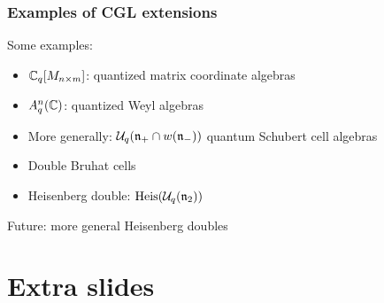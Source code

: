 \documentclass[aspectratio=169]{beamer}
\begin{document}
\begin{frame}
	\frametitle{Examples of CGL extensions}

	Some examples:
	\begin{itemize}
		\item $\mathbb{C}_q[M_{n\times m}]$: quantized matrix coordinate algebras
		\item $A^n_q(\mathbb{C})$: quantized Weyl algebras
		\item More generally: $\mathcal{U}_q(\mathfrak{n}_+ \cap w(\mathfrak{n}_-))$ quantum Schubert cell algebras
		\item Double Bruhat cells \pause
		\item Heisenberg double: $\operatorname{Heis}(\mathcal{U}_q(\mathfrak{n}_2))$
	\end{itemize}
	\medskip
	\pause
	Future: more general Heisenberg doubles

\end{frame}

\appendix

\section{Extra slides}
\end{document}
